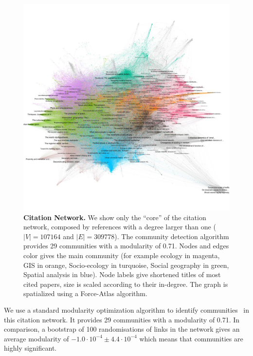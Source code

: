 \begin{figure}
\hspace{-2cm}
\includegraphics[width=1.6\textwidth]{figures/Fig5.jpg}
\caption{\textbf{Citation Network.} We show only the ``core'' of the citation network, composed by references with a degree larger than one ($\left|V\right| = 107164$ and $\left|E\right| = 309778$). The community detection algorithm provides 29 communities with a modularity of 0.71. Nodes and edges color gives the main community (for example ecology in magenta, GIS in orange, Socio-ecology in turquoise, Social geography in green, Spatial analysis in blue). Node labels give shortened titles of most cited papers, size is scaled according to their in-degree. The graph is spatialized using a Force-Atlas algorithm.}
\label{fig:citnw}
\end{figure}


We use a standard modularity optimization algorithm to identify communities~\citep{blondel2008fast} in this citation network. It provides 29 communities with a modularity of 0.71. In comparison, a bootstrap of 100 randomisations of links in the network gives an average modularity of $-1.0\cdot 10^{-4} \pm 4.4\cdot 10^{-4}$ which means that communities are highly significant.


